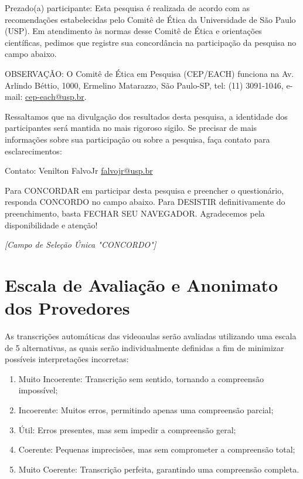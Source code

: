 \noindent
Prezado(a) participante: Esta pesquisa é realizada de acordo com as recomendações 
estabelecidas pelo Comitê de Ética da Universidade de São Paulo (USP). Em atendimento às 
normas desse Comitê de Ética e orientações científicas, pedimos que registre sua 
concordância na participação da pesquisa no campo abaixo.

\noindent
OBSERVAÇÃO: O Comitê de Ética em Pesquisa (CEP/EACH) funciona na Av. Arlindo Béttio, 
1000, Ermelino Matarazzo, São Paulo-SP, tel: (11) 3091-1046, e-mail: \href{mailto:cep-each@usp.br}{cep-each@usp.br}.

\noindent
Ressaltamos que na divulgação dos resultados desta pesquisa, a identidade dos participantes 
será mantida no mais rigoroso sigilo. Se precisar de mais informações sobre sua participação 
ou sobre a pesquisa, faça contato para esclarecimentos: 

\noindent
Contato: Venilton FalvoJr \href{mailto:falvojr@usp.br}{falvojr@usp.br}

\noindent
Para CONCORDAR em participar desta pesquisa e preencher o questionário, responda CONCORDO no campo abaixo. Para DESISTIR definitivamente do preenchimento, basta FECHAR SEU NAVEGADOR. Agradecemos pela disponibilidade e atenção!

\noindent
\textit{[Campo de Seleção Única "CONCORDO"]}

\section{Escala de Avaliação e Anonimato dos Provedores}

\noindent
As transcrições automáticas das videoaulas serão avaliadas utilizando uma escala de 5 
alternativas, as quais serão individualmente definidas a fim de minimizar possíveis 
interpretações incorretas: 

\begin{enumerate}
    \item Muito Incoerente: Transcrição sem sentido, tornando a compreensão impossível;
    \item Incoerente: Muitos erros, permitindo apenas uma compreensão parcial;
    \item Útil: Erros presentes, mas sem impedir a compreensão geral;
    \item Coerente: Pequenas imprecisões, mas sem comprometer a compreensão total;
    \item Muito Coerente: Transcrição perfeita, garantindo uma compreensão completa.
\end{enumerate}

